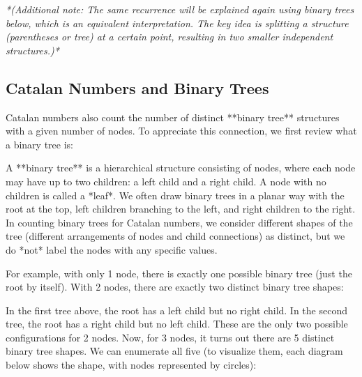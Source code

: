 \documentclass{article}
\begin{document}
\textit{*(Additional note: The same recurrence will be explained again using binary trees below, which is an equivalent interpretation. The key idea is splitting a structure (parentheses or tree) at a certain point, resulting in two smaller independent structures.)*}

\subsection*{Catalan Numbers and Binary Trees}

Catalan numbers also count the number of distinct **binary tree** structures with a given number of nodes. To appreciate this connection, we first review what a binary tree is:

A **binary tree** is a hierarchical structure consisting of nodes, where each node may have up to two children: a left child and a right child. A node with no children is called a *leaf*. We often draw binary trees in a planar way with the root at the top, left children branching to the left, and right children to the right. In counting binary trees for Catalan numbers, we consider different shapes of the tree (different arrangements of nodes and child connections) as distinct, but we do *not* label the nodes with any specific values.

For example, with only 1 node, there is exactly one possible binary tree (just the root by itself). With 2 nodes, there are exactly two distinct binary tree shapes:

\begin{center}
\hspace{1cm}
\end{center}

In the first tree above, the root has a left child but no right child. In the second tree, the root has a right child but no left child. These are the only two possible configurations for 2 nodes. Now, for 3 nodes, it turns out there are 5 distinct binary tree shapes. We can enumerate all five (to visualize them, each diagram below shows the shape, with nodes represented by circles):
\end{document}
